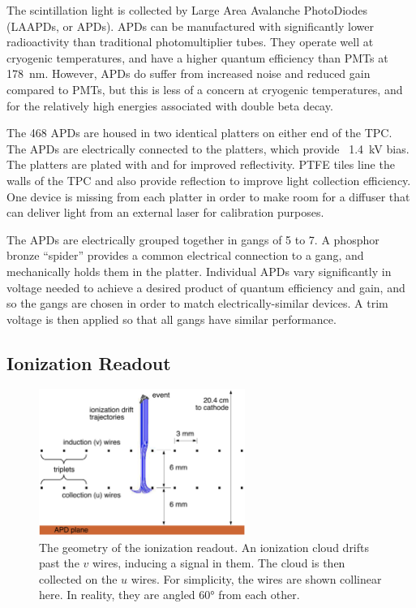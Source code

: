 \documentclass[herrin-thesis.tex]{subfiles}
\begin{document}
The scintillation light is collected by Large Area Avalanche PhotoDiodes (LAAPDs, or APDs). APDs can be manufactured with significantly lower radioactivity than traditional photomultiplier tubes. They operate well at cryogenic temperatures, and have a higher quantum efficiency than PMTs at \SI{178}{\nm}. However, APDs do suffer from increased noise and reduced gain compared to PMTs, but this is less of a concern at cryogenic temperatures, and for the relatively high energies associated with double beta decay.

The 468 APDs are housed in two identical platters on either end of the TPC. The APDs are electrically connected to the platters, which provide \about~\SI{1.4}{\kV} bias. The platters are plated with  and  for improved reflectivity. PTFE tiles line the walls of the TPC and also provide reflection to improve light collection efficiency. One device is missing from each platter in order to make room for a diffuser that can deliver light from an external laser for calibration purposes.

The APDs are electrically grouped together in gangs of 5 to 7. A phosphor bronze ``spider'' provides a common electrical connection to a gang, and mechanically holds them in the platter. Individual APDs vary significantly in voltage needed to achieve a desired product of quantum efficiency and gain, and so the gangs are chosen in order to match electrically-similar devices\cite{Neilson:2009fk}. A trim voltage is then applied so that all gangs have similar performance.

\subsection{Ionization Readout}

\begin{figure}
\centering
\includegraphics[width=0.6\textwidth]{./figures/detector_wire_geometry.pdf}
\caption[Geometry of the ionization readout wire planes]{The geometry of the ionization readout. An ionization cloud drifts past the \(v\) wires, inducing a signal in them. The cloud is then collected on the \(u\) wires. For simplicity, the wires are shown collinear here. In reality, they are angled \ang{60} from each other.}
\label{fig:detector_wire_geometry}
\end{figure}
\end{document}
